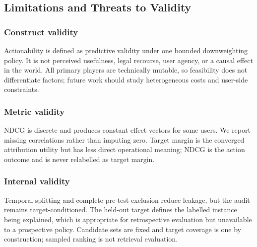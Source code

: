 \documentclass[a4paper,fleqn,doubleblind]{cas-sc}
\begin{document}
\subsection{Limitations and Threats to Validity}\label{sec:limitations}
\subsubsection{Construct validity}
Actionability is defined as predictive validity under one bounded downweighting policy. It is not perceived usefulness, legal recourse, user agency, or a causal effect in the world. All primary players are technically mutable, so feasibility does not differentiate factors; future work should study heterogeneous costs and user-side constraints.

\subsubsection{Metric validity}
NDCG is discrete and produces constant effect vectors for some users. We report missing correlations rather than imputing zero. Target margin is the converged attribution utility but has less direct operational meaning; NDCG is the action outcome and is never relabelled as target margin.

\subsubsection{Internal validity}
Temporal splitting and complete pre-test exclusion reduce leakage, but the audit remains target-conditioned. The held-out target defines the labelled instance being explained, which is appropriate for retrospective evaluation but unavailable to a prospective policy. Candidate sets are fixed and target coverage is one by construction; sampled ranking is not retrieval evaluation.
\end{document}
